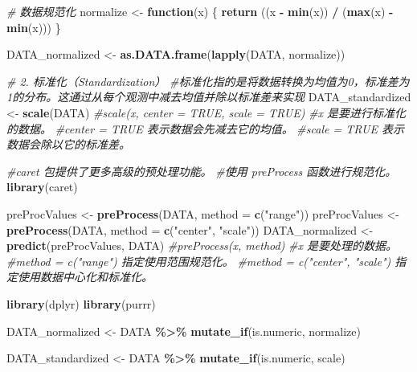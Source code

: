 \documentclass[
]{article}
\newenvironment{Shaded}{\begin{snugshade}}{\end{snugshade}}
\newcommand{\AttributeTok}[1]{\textcolor[rgb]{0.13,0.29,0.53}{#1}}
\newcommand{\CommentTok}[1]{\textcolor[rgb]{0.56,0.35,0.01}{\textit{#1}}}
\newcommand{\ControlFlowTok}[1]{\textcolor[rgb]{0.13,0.29,0.53}{\textbf{#1}}}
\newcommand{\FunctionTok}[1]{\textcolor[rgb]{0.13,0.29,0.53}{\textbf{#1}}}
\newcommand{\NormalTok}[1]{#1}
\newcommand{\OtherTok}[1]{\textcolor[rgb]{0.56,0.35,0.01}{#1}}
\newcommand{\SpecialCharTok}[1]{\textcolor[rgb]{0.81,0.36,0.00}{\textbf{#1}}}
\newcommand{\StringTok}[1]{\textcolor[rgb]{0.31,0.60,0.02}{#1}}
\begin{document}
\begin{Shaded}
\begin{Highlighting}[]
\CommentTok{\# 数据规范化}
\NormalTok{normalize }\OtherTok{\textless{}{-}} \ControlFlowTok{function}\NormalTok{(x) \{}
  \FunctionTok{return}\NormalTok{ ((x }\SpecialCharTok{{-}} \FunctionTok{min}\NormalTok{(x)) }\SpecialCharTok{/}\NormalTok{ (}\FunctionTok{max}\NormalTok{(x) }\SpecialCharTok{{-}} \FunctionTok{min}\NormalTok{(x)))}
\NormalTok{\}}

\NormalTok{DATA\_normalized }\OtherTok{\textless{}{-}} \FunctionTok{as.DATA.frame}\NormalTok{(}\FunctionTok{lapply}\NormalTok{(DATA, normalize))}

\CommentTok{\#   2. 标准化（Standardization）}
\CommentTok{\#标准化指的是将数据转换为均值为0，标准差为1的分布。这通过从每个观测中减去均值并除以标准差来实现}
\NormalTok{DATA\_standardized }\OtherTok{\textless{}{-}} \FunctionTok{scale}\NormalTok{(DATA)}
\CommentTok{\#scale(x, center = TRUE, scale = TRUE)}
\CommentTok{\#x 是要进行标准化的数据。}
\CommentTok{\#center = TRUE 表示数据会先减去它的均值。}
\CommentTok{\#scale = TRUE 表示数据会除以它的标准差。}

\CommentTok{\#caret 包提供了更多高级的预处理功能。}
\CommentTok{\#使用 preProcess 函数进行规范化。}
\FunctionTok{library}\NormalTok{(caret)}

\NormalTok{preProcValues }\OtherTok{\textless{}{-}} \FunctionTok{preProcess}\NormalTok{(DATA, }\AttributeTok{method =} \FunctionTok{c}\NormalTok{(}\StringTok{"range"}\NormalTok{))}
\NormalTok{preProcValues }\OtherTok{\textless{}{-}} \FunctionTok{preProcess}\NormalTok{(DATA, }\AttributeTok{method =} \FunctionTok{c}\NormalTok{(}\StringTok{"center"}\NormalTok{, }\StringTok{"scale"}\NormalTok{))}
\NormalTok{DATA\_normalized }\OtherTok{\textless{}{-}} \FunctionTok{predict}\NormalTok{(preProcValues, DATA)}
\CommentTok{\#preProcess(x, method)}
\CommentTok{\#x 是要处理的数据。}
\CommentTok{\#method = c("range") 指定使用范围规范化。}
\CommentTok{\#method = c("center", "scale") 指定使用数据中心化和标准化。}

\FunctionTok{library}\NormalTok{(dplyr)}
\FunctionTok{library}\NormalTok{(purrr)}

\NormalTok{DATA\_normalized }\OtherTok{\textless{}{-}}\NormalTok{ DATA }\SpecialCharTok{\%\textgreater{}\%}
  \FunctionTok{mutate\_if}\NormalTok{(is.numeric, normalize)}

\NormalTok{DATA\_standardized }\OtherTok{\textless{}{-}}\NormalTok{ DATA }\SpecialCharTok{\%\textgreater{}\%}
  \FunctionTok{mutate\_if}\NormalTok{(is.numeric, scale)}
\end{Highlighting}
\end{Shaded}
\end{document}
